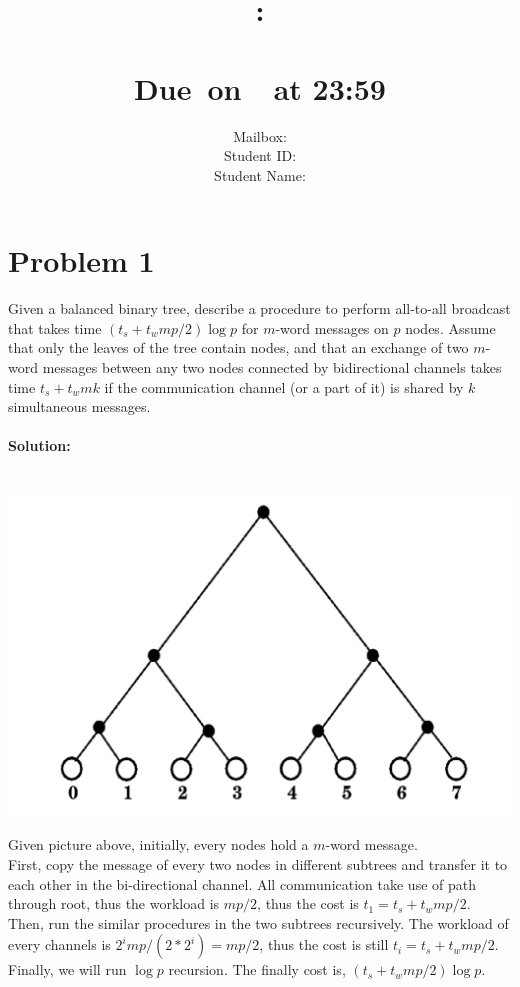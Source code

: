 \documentclass{article}
\title{
    \vspace{2in}
    \textmd{\textbf{\hmwkClass:\\  \hmwkTitle}}\\
    \normalsize\vspace{0.1in}\small{Due\ on\ \hmwkDueDate\ at 23:59 }\\
   \vspace{2in}
}
\author{
    Mailbox: \hmwkAuthorMail\\
	Student ID: \hmwkAuthorID\\
    Student Name: \hmwkAuthorName}
\date{}
\begin{document}
\maketitle
\pagebreak
\tableofcontents

\pagebreak





\section{Problem 1}
Given a balanced binary tree, describe a procedure to perform all-to-all 
broadcast that takes time $(t_{s} + t_{w}mp/2)\log p$ for $m$-word messages on $p$ nodes. Assume that only the leaves of the tree contain nodes, and that an exchange of 
two $m$-word messages between any two nodes connected by bidirectional 
channels takes time $t_{s} + t_{w}mk$ if the communication channel (or a part of it) is 
shared by $k$ simultaneous messages.\\\\
\textbf{Solution: }\\\\
\begin{center}
    \includegraphics[scale = 0.25]{p1.png}\\
\end{center}
Given picture above, initially, every nodes hold a $m$-word message.\\
First, copy the message of every two nodes in different subtrees and transfer it to each other in the bi-directional channel. All communication take use of path through root, thus the workload is $mp/2$, thus the cost is $t_{1}=t_{s}+t_{w}mp/2$.\\
Then, run the similar procedures in the two subtrees recursively. The workload of every channels is $2^imp/(2*2^i)=mp/2$, thus the cost is still $t_{i}=t_{s}+t_{w}mp/2$. 
Finally, we will run $\log p$ recursion. The finally cost is, $(t_{s} + t_{w}mp/2)\log p$.
\pagebreak
\end{document}
